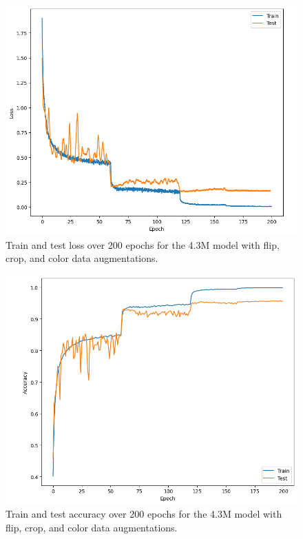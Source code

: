 \documentclass[letterpaper]{article} %
\begin{document}
\begin{figure}[t]
\centering
\includegraphics[width=0.95\columnwidth]{loss_4M.png}
\caption{Train and test loss over 200 epochs for the 4.3M model with flip, crop, and color data augmentations.}
\label{fig3}
\end{figure}

\begin{figure}[t]
\centering
\includegraphics[width=0.95\columnwidth]{accuracy_4M.png}
\caption{Train and test accuracy over 200 epochs for the 4.3M model with flip, crop, and color data augmentations.}
\label{fig4}
\end{figure}


\end{document}

